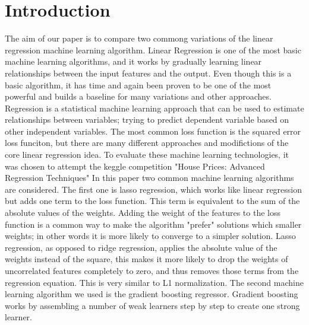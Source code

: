 \section{Introduction}
The aim of our paper is to compare two commong variations of the linear regression machine learning algorithm. Linear Regression is one of the most basic machine learning algorithms, and it works by gradually learning linear relationships between the input features and the output. Even though this is a basic algorithm, it has time and again been proven to be one of the most powerful and builds a baseline for many variations and other approaches.
Regression is a statistical machine learning approach that can be used to estimate relationships between variables; trying to predict dependent variable based on other independent variables. The most common loss function is the squared error loss funciton, but there are many different approaches and modifictions of the core linear regression idea.\newline
To evaluate these machine learning technologies, it was chosen to attempt the keggle competition "House Prices: Advanced Regression Techniques"\cite{kaggle}
In this paper two common machine learning algorithms are considered.\newline
The first one is lasso regression, which works like linear regression but adds one term to the loss function. This term is equivalent to the sum of the absolute values of the weights. Adding the weight of the features to the loss function is a common way to make the algorithm "prefer" solutions which smaller weights; in other words it is more likely to converge to a simpler solution. Lasso regression, as opposed to ridge regression, applies the absolute value of the weights instead of the square, this makes it more likely to drop the weights of uncorrelated features completely to zero, and thus removes those terms from the regression equation. This is very similar to L1 normalization.\newline
The second machine learning algorithm we used is the gradient boosting regressor. Gradient boosting works by assembling a number of weak learners step by step to create one strong learner\cite{mason_2002}.\newline

